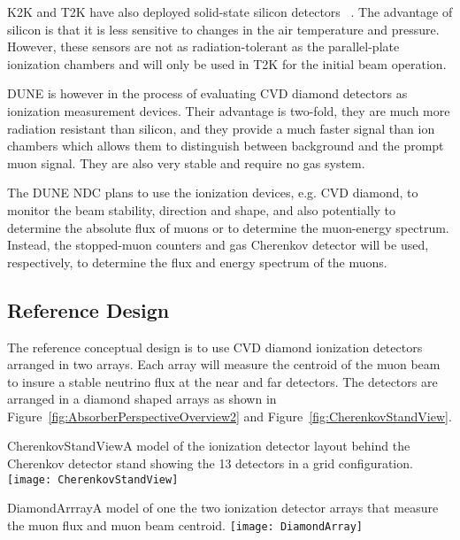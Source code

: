 K2K and T2K have also deployed solid-state silicon detectors~\cite{ref:Maruyama}
\cite{ref:RD42A}. The advantage of silicon is that it is less
sensitive to changes in the air temperature and pressure. However, these %
sensors are not as radiation-tolerant as the parallel-plate ionization 
chambers and will only be used in T2K for the initial
beam operation. 

DUNE is however in the process of evaluating CVD diamond detectors
as ionization measurement devices. Their advantage is two-fold, they are much more
radiation resistant than silicon, and they provide a much faster signal than ion chambers
which allows them to distinguish between background and the prompt muon signal. They 
are also very stable and require no gas system.

The DUNE NDC plans to use the ionization devices, e.g. CVD diamond, to monitor
the beam stability, direction and shape, 
and also potentially to determine the absolute flux of muons or to determine the 
muon-energy spectrum. Instead, the stopped-muon counters %
and gas Cherenkov detector %
will be used, respectively, to determine the flux and energy
spectrum of the muons. 

\subsection{Reference Design}

The reference conceptual design is to use CVD diamond ionization detectors arranged in two
arrays. Each array will measure the centroid of the muon beam to insure a stable neutrino flux
at the near and far detectors. The detectors are arranged in a diamond shaped arrays as shown in 
Figure~\ref{fig:AbsorberPerspectiveOverview2} and Figure~\ref{fig:CherenkovStandView}.

\begin{cdrfigure}{CherenkovStandView}{A model of the ionization detector layout behind the Cherenkov detector stand showing the 13 detectors in a grid configuration.}
\texttt{[image: CherenkovStandView]}

\end{cdrfigure}

\begin{cdrfigure}{DiamondArrray}{A model of one the two ionization detector arrays
that measure the muon flux and muon beam centroid.
}
\texttt{[image: DiamondArray]}
\end{cdrfigure}

